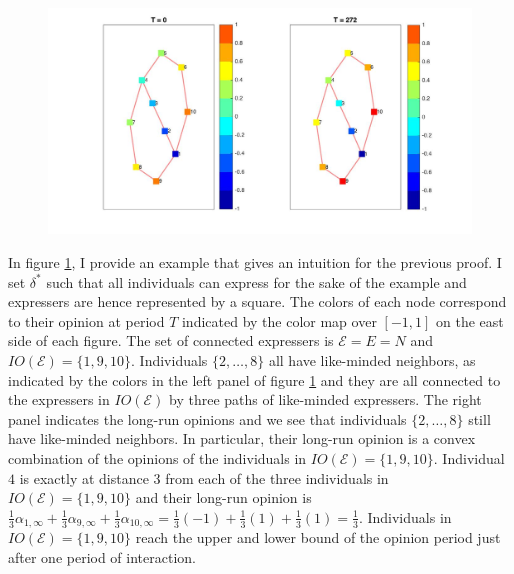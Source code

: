 \documentclass{article}
\begin{document}
\begin{figure}[ht]
\centering
\includegraphics[scale=0.25]{img/example_proof.jpg}
\caption{ }
\label{exampleproof}
\end{figure}

In figure \ref{exampleproof}, I provide an example that gives an intuition for the previous proof. I set $\delta^{*}$ such that all individuals can express for the sake of the example and expressers are hence represented by a square. The colors of each node correspond to their opinion at period $T$ indicated by the color map over $[-1,1]$ on the east side of each figure. The set of connected expressers is $\mathcal{E}=E=N$  and ${IO} (\mathcal{E}) =\{1,9,10 \}$. Individuals $\{2, \ldots , 8 \}$ all have like-minded neighbors, as indicated by the colors in the left panel of figure \ref{exampleproof} and they are all connected to the expressers in  ${IO} (\mathcal{E})$ by three paths of like-minded expressers. The right panel indicates the long-run opinions and we see that individuals $\{2, \ldots , 8 \}$ still have like-minded neighbors. In particular, their long-run opinion is a convex combination of the opinions of the individuals in ${IO} (\mathcal{E}) =\{1,9,10 \}$. Individual $4$ is exactly at distance $3$ from each of the three individuals  in ${IO} (\mathcal{E}) =\{1,9,10 \}$ and their long-run opinion is $\frac{1}{3} \alpha_{1,\infty} + \frac{1}{3} \alpha_{9,\infty} + \frac{1}{3} \alpha_{10,\infty}= \frac{1}{3} (-1) + \frac{1}{3}(1) + \frac{1}{3} (1) =\frac{1}{3}$. Individuals in ${IO} (\mathcal{E}) =\{1,9,10 \}$ reach the upper and lower bound of the opinion period just after one period of interaction. 



\bigskip
\end{document}
